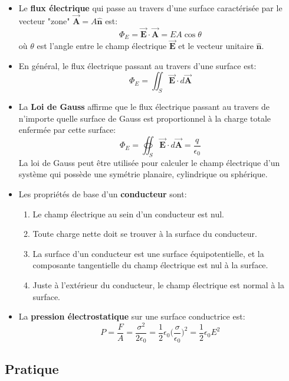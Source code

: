 \documentclass[a4paper]{article}
\begin{document}
\begin{itemize}
    \item Le \textbf{flux électrique} qui passe au travers d'une surface caractérisée par le vecteur "zone" $ \vec{\textbf{A}} = A 
\hat{\textbf{n}} $ est: \[ \Phi_E = \vec{\textbf{E}} \cdot \vec{\textbf{A}} = E A \cos \theta \]
où $ \theta $ est l'angle entre le champ électrique $ \vec{\textbf{E}} $ et le vecteur unitaire $ \hat{\textbf{n}} $.
    \item En général, le flux électrique passant au travers d'une surface est: \[ \Phi_E = \iint_S \vec{\textbf{E}} \cdot d \vec{\textbf{A}} \]
    \item La \textbf{Loi de Gauss} affirme que le flux électrique passant au travers de n'importe quelle surface de Gauss est 
proportionnel à la charge totale enfermée par cette surface: \[ \Phi_E = \oiint_S \vec{\textbf{E}} \cdot d \vec{\textbf{A}} = \frac{q}{\epsilon_0} \]
La loi de Gauss peut être utilisée pour calculer le champ électrique d'un système qui possède une symétrie planaire, cylindrique ou sphérique.
    \item Les propriétés de base d'un \textbf{conducteur} sont: 
    \begin{enumerate}
        \item Le champ électrique au sein d'un conducteur est nul.
        \item Toute charge nette doit se trouver à la surface du conducteur.
        \item La surface d'un conducteur est une surface équipotentielle, et la composante tangentielle du champ électrique est nul à la surface.
        \item Juste à l'extérieur du conducteur, le champ électrique est normal à la surface.
    \end{enumerate}
    \item La \textbf{pression électrostatique} sur une surface conductrice est: \[ P = \frac{F}{A} = \frac{\sigma^2}{2 \epsilon_0} = 
\frac{1}{2} \epsilon_0 \Big( \frac{\sigma}{\epsilon_0} \Big)^2 = \frac{1}{2} \epsilon_0 E^2 \]
\end{itemize}
















\subsection{Pratique}
\end{document}
